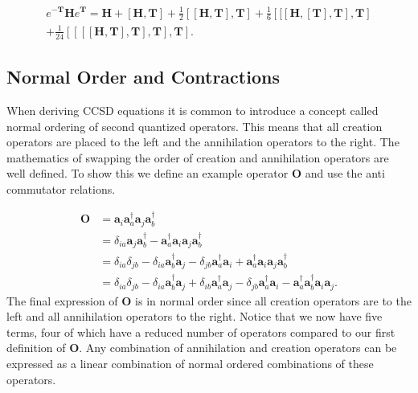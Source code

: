 \documentclass[a4paper,norsk,11pt,twoside]{report}
\begin{document}
\begin{equation}
\begin{split}
e^{-\textbf{T}} \textbf{H} e^{\textbf{T}} = 
\textbf{H} 
+ \left[ \textbf{H}, \textbf{T} \right] 
+ \frac{1}{2} \left[ [\textbf{H}, \textbf{T}], \textbf{T} \right] 
+ \frac{1}{6} \left[ [ [ \textbf{H},[\textbf{T}], \textbf{T}], \textbf{T} \right] \\
+ \frac{1}{24} \left[ [ [ [\textbf{H}, \textbf{T}], \textbf{T}], \textbf{T}], \textbf{T}  \right] .
\end{split}  \label{variationalccsd}
\end{equation}

\subsection{Normal Order and Contractions}
When deriving CCSD equations it is common to introduce a concept called normal ordering of second quantized operators. This means that all creation operators are placed to the left and the annihilation operators to the right. The mathematics of swapping the order of creation and annihilation operators are well defined. To show this we define an example operator $\textbf{O}$ and use the anti commutator relations.

\begin{align}
\textbf{O} & = 
\textbf{a}_i 
\textbf{a}^{\dag}_a 
\textbf{a}_j 
\textbf{a}^{\dag}_b \label{normalorder} \\ &
= \delta_{ia} 
\textbf{a}_j 
\textbf{a}^{\dag}_b - 
\textbf{a}^{\dag}_a 
\textbf{a}_i  
\textbf{a}_j 
\textbf{a}^{\dag}_b \nonumber \\ &
= \delta_{ia} \delta_{jb} -
\delta_{ia} 
\textbf{a}^{\dag}_b
\textbf{a}_j -
\delta_{jb}
\textbf{a}^{\dag}_a
\textbf{a}_i +
\textbf{a}^{\dag}_a
\textbf{a}_i
\textbf{a}_j
\textbf{a}^{\dag}_b \nonumber \\ &
= \delta_{ia} \delta_{jb} - 
\delta_{ia} 
\textbf{a}^{\dag}_b
\textbf{a}_j +
\delta_{ib} 
\textbf{a}^{\dag}_a
\textbf{a}_j -
\delta_{jb} 
\textbf{a}^{\dag}_a
\textbf{a}_i -
\textbf{a}^{\dag}_a
\textbf{a}^{\dag}_b
\textbf{a}_i
\textbf{a}_j .
\end{align}
The final expression of $\textbf{O}$ is in normal order since all creation operators are to the left and all annihilation operators to the right. Notice that we now have five terms, four of which have a reduced number of operators compared to our first definition of $\textbf{O}$. Any combination of annihilation and creation operators can be expressed as a linear combination of normal ordered combinations of these operators. \\
\end{document}
